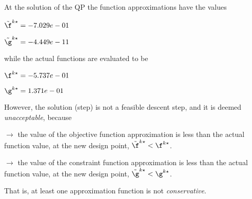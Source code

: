 At the solution of the QP the function approximations have the values

$\tilde \f^{k\star} = -7.029e-01$

$\tilde \g^{k\star} = -4.449e-11$

\bigskip
while the actual functions are evaluated to be

$\f^{k\star} = -5.737e-01$

$\g^{k\star} =  1.371e-01$

\bigskip
 However, the solution (step)                         is not a feasible descent step, and it is deemed                         \emph{unacceptable}, because 
 
$\to$ the value of the objective                             function approximation is less than the actual function                             value, at the new design point,                             $\tilde {\f}^{k\star} < {\f}^{k\star}$.

 $\to$ the value of the constraint function                             approximation is less than the actual function value, at                             the new design point, $\tilde {\g}^{k\star} < {\g}^{k\star}$.

 \bigskip 

 That is, at least one approximation                         function is not \emph{conservative}.
